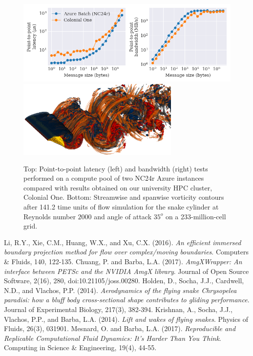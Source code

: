 \documentclass{parcfd2018}
\begin{document}
\begin{figure}[!h]
\centering
\includegraphics[width=12cm]{figures/latencyBandwidthColonialOneAzure.png}
\includegraphics[width=8cm]{figures/wz_wx_wake3d_2k35_meshB_0026.png}
\caption{Top: Point-to-point latency (left) and bandwidth (right) tests performed on a compute pool of two NC24r Azure instances compared with results obtained on our university HPC cluster, Colonial One.
Bottom: Streamwise and spanwise vorticity contours after 141.2 time units of flow simulation for the snake cylinder at Reynolds number $2000$ and angle of attack $35^o$ on a 233-million-cell grid.}
\label{latency_bandwidth_wz_wx}
\end{figure}

\footnotesize
\begin{thebibliography}{99}
  Li, R.Y., Xie, C.M., Huang, W.X., and Xu, C.X. (2016). \textit{An efficient immersed boundary projection method for flow over complex/moving boundaries}. Computers \& Fluids, 140, 122-135.
  Chuang, P. and Barba, L.A. (2017). \textit{AmgXWrapper: An interface between PETSc and the NVIDIA AmgX library}. Journal of Open Source Software, 2(16), 280, doi:10.21105/joss.00280.
  Holden, D., Socha, J.J., Cardwell, N.D., and Vlachos, P.P. (2014). \textit{Aerodynamics of the flying snake Chrysopelea paradisi: how a bluff body cross-sectional shape contributes to gliding performance}. Journal of Experimental Biology, 217(3), 382-394.
 Krishnan, A., Socha, J.J., Vlachos, P.P., and Barba, L.A. (2014). \textit{Lift and wakes of flying snakes}. Physics of Fluids, 26(3), 031901.
  Mesnard, O. and Barba, L.A. (2017). \textit{Reproducible and Replicable Computational Fluid Dynamics: It's Harder Than You Think}. Computing in Science \& Engineering, 19(4), 44-55.
\end{thebibliography}
\end{document}
